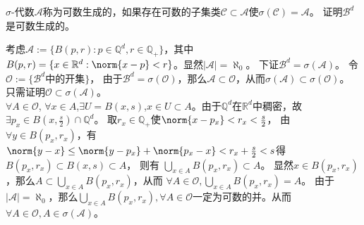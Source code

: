 \documentclass{ctexart}
\begin{document}
\begin{problem}\label{pro:1.4.4}
  \(\sigma \)-代数\(\mathcal{A} \)称为可数生成的，如果存在可数的子集类\(\mathcal{C} \subset \mathcal{A} \)使\(\sigma(\mathcal{C})=\mathcal{A} \)。
  证明\(\mathcal{B}^d \)是可数生成的。
\end{problem}
\begin{solution}
  考虑\(\mathcal{A}:=\{B(p,r):p \in \mathbb{Q}^d, r \in \mathbb{Q}_{+}\} \)，其中\(B(p,r)=\{x \in \mathbb{R}^d:\norm{x-p} < r\} \)。显然\(|\mathcal{A}|=\aleph_0 \)。
  下证\(\mathcal{B}^d=\sigma(\mathcal{A}) \)。
  令\(\mathcal{O}:=\{\mathcal{B}^d \text{中的开集}\} \)，
  由于\(\mathcal{B}^d=\sigma(\mathcal{O}) \)，那么\( \mathcal{A} \subset \mathcal{O} \)，从而\(\sigma(\mathcal{A})\subset \sigma(\mathcal{O}) \)。
  只需证明\(\mathcal{O} \subset \sigma(\mathcal{A}) \)。\\ 
  \(\forall A \in \mathcal{O} \), \( \forall x \in A \),\(\exists U=B(x,s) \),\(x \in U \subset A \)。由于\(\mathbb{Q}^d \)在\(\mathbb{R}^d \)中稠密，故\(\exists p_x \in B(x,\frac{s}{2}) \cap \mathbb{Q}^d \)。
  取\(r_x \in \mathbb{Q}_{+} \)使\(\norm{x-p_x} <r_x<\frac{s}{2} \)， 由 \(\forall y \in B(p_x,r_x) \)，有\(\norm{y-x}\leq \norm{y-p_x}+\norm{p_x-x} < r_x+\frac{s}{2}<s \)得 \(B(p_x,r_x) \subset B(x,s)\subset A \)，
    则有 \(\bigcup_{x \in A}B(p_x,r_x) \subset  A \)。
  显然\(x \in B(p_x,r_x) \)，那么\(A \subset \bigcup_{x \in A}B(p_x,r_x) \)，从而 \(\forall A \in \mathcal{O},\bigcup_{x \in A}B(p_x,r_x) = A \)。
  由于\(|\mathcal{A}|=\aleph_0 \)，那么\(\bigcup_{x \in A}B(p_x,r_x),\forall A \in \mathcal{O}  \)一定为可数的并。从而\(\forall A \in \mathcal{O},A \in \sigma(\mathcal{A}) \)。
\end{solution}
\end{document}
